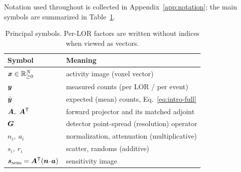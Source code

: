 Notation used throughout is collected in Appendix~\ref{app:notation}; the main
symbols are summarized in Table~\ref{tab:intro-notation}.

\begin{table}[t]
  \centering
  \begin{tabular}{ll}
    \toprule
    Symbol & Meaning \\
    \midrule
    $\bm{x}\in\mathbb{R}^N_{\ge0}$ & activity image (voxel vector) \\
    $\bm{y}$               & measured counts (per LOR / per event) \\
    $\bar{\bm{y}}$             & expected (mean) counts, Eq.~\eqref{eq:intro-full} \\
    $\Aop,\ \Aadj$      & forward projector and its matched adjoint \\
    $\bm{G}$              & detector point-spread (resolution) operator \\
    $n_i,\ a_i$         & normalization, attenuation (multiplicative) \\
    $s_i,\ r_i$         & scatter, randoms (additive) \\
    $\bm{s}_{\mathrm{sens}}=\bm{A}^{\mathsf{T}}(\bm{n}\!\cdot\!\bm{a})$ & sensitivity image \\
    \bottomrule
  \end{tabular}
  \caption{Principal symbols. Per-LOR factors are written without indices when
           viewed as vectors.}
  \label{tab:intro-notation}
\end{table}
